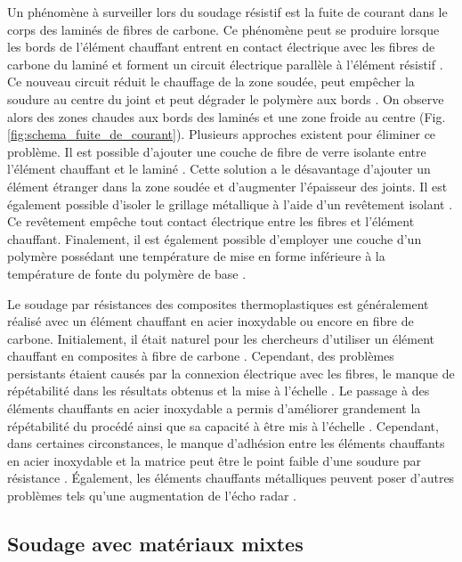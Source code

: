 Un phénomène à surveiller lors du soudage résistif est la fuite de courant dans le corps des laminés de fibres de carbone. 
Ce phénomène peut se produire lorsque les bords de l'élément chauffant entrent en contact électrique avec les fibres de carbone du laminé et forment un circuit électrique parallèle à l'élément résistif \cite{Hou1999a,Ageorges2000}. 
Ce nouveau circuit réduit le chauffage de la zone soudée, peut empêcher la soudure au centre du joint et peut dégrader le polymère aux bords \cite{Dube2008}. 
On observe alors des zones chaudes aux bords des laminés et une zone froide au centre (Fig. \ref{fig:schema_fuite_de_courant}). 
Plusieurs approches existent pour éliminer ce problème. 
Il est possible d'ajouter une couche de fibre de verre isolante entre l'élément chauffant et le laminé \cite{Hou1999a}. 
Cette solution a le désavantage d'ajouter un élément étranger dans la zone soudée et d'augmenter l'épaisseur des joints. 
Il est également possible d'isoler le grillage métallique à l'aide d'un revêtement isolant \cite{Dube2008,Dube2009a}. 
Ce revêtement empêche tout contact électrique entre les fibres et l'élément chauffant. 
Finalement, il est également possible d'employer une couche d'un polymère possédant une température de mise en forme inférieure à la température de fonte du polymère de base \cite{Stavrov2005a}. 

Le soudage par résistances des composites thermoplastiques est généralement réalisé avec un élément chauffant en acier inoxydable ou encore en fibre de carbone. 
Initialement, il était naturel pour les chercheurs d'utiliser un élément chauffant en composites à fibre de carbone \cite{Ageorges2000a,houghton1984bonding,Eveno1988}. 
Cependant, des problèmes persistants étaient causés par la connexion électrique avec les fibres, le manque de répétabilité dans les résultats obtenus et la mise à l'échelle \cite{McKnight1997}. 
Le passage à des éléments chauffants en acier inoxydable a permis d'améliorer grandement la répétabilité du procédé ainsi que sa capacité à être mis à l'échelle \cite{Hou1999a}.  
Cependant, dans certaines circonstances, le manque d'adhésion entre les éléments chauffants en acier inoxydable et la matrice peut être le point faible d'une soudure par résistance \cite{Dube2007,Dube2012a,Dube2009a,Shi2014,Shi2015a}. 
Également, les éléments chauffants métalliques peuvent poser d'autres problèmes tels qu'une augmentation de l'écho radar \cite{Ageorges2001a}. 

\FloatBarrier
\subsection{Soudage avec matériaux mixtes}


